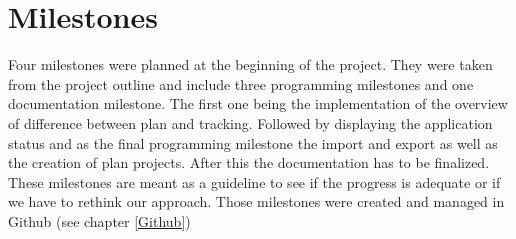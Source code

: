 \section{Milestones}
Four milestones were planned at the beginning of the project. They were taken from the project outline and include three programming milestones and one documentation milestone. The first one being the implementation of the overview of difference between plan and tracking. Followed by displaying the application status and as the final programming milestone the import and export as well as the creation of plan projects. After this the documentation has to be finalized. These milestones are meant as a guideline to see if the progress is adequate or if we have to rethink our approach. Those milestones were created and managed in Github (see chapter \ref{Github}) 